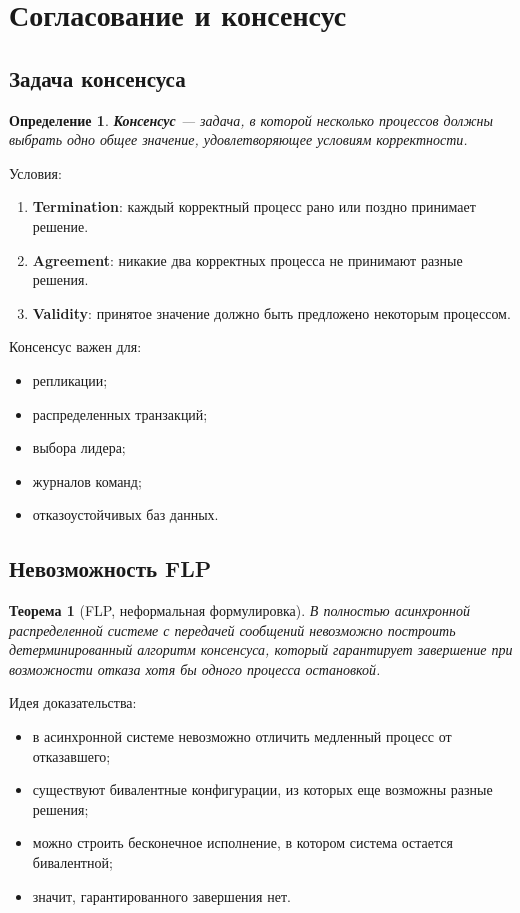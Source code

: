 \documentclass[12pt,a4paper]{article}
\newtheorem{definition}{Определение}
\newtheorem{theorem}{Теорема}
\begin{document}
\section{Согласование и консенсус}

\subsection{Задача консенсуса}

\begin{definition}
\textbf{Консенсус} --- задача, в которой несколько процессов должны выбрать одно общее значение, удовлетворяющее условиям корректности.
\end{definition}

Условия:
\begin{enumerate}
    \item \textbf{Termination}: каждый корректный процесс рано или поздно принимает решение.
    \item \textbf{Agreement}: никакие два корректных процесса не принимают разные решения.
    \item \textbf{Validity}: принятое значение должно быть предложено некоторым процессом.
\end{enumerate}

Консенсус важен для:
\begin{itemize}
    \item репликации;
    \item распределенных транзакций;
    \item выбора лидера;
    \item журналов команд;
    \item отказоустойчивых баз данных.
\end{itemize}

\subsection{Невозможность FLP}

\begin{theorem}[FLP, неформальная формулировка]
В полностью асинхронной распределенной системе с передачей сообщений невозможно построить детерминированный алгоритм консенсуса, который гарантирует завершение при возможности отказа хотя бы одного процесса остановкой.
\end{theorem}

Идея доказательства:
\begin{itemize}
    \item в асинхронной системе невозможно отличить медленный процесс от отказавшего;
    \item существуют бивалентные конфигурации, из которых еще возможны разные решения;
    \item можно строить бесконечное исполнение, в котором система остается бивалентной;
    \item значит, гарантированного завершения нет.
\end{itemize}
\end{document}
